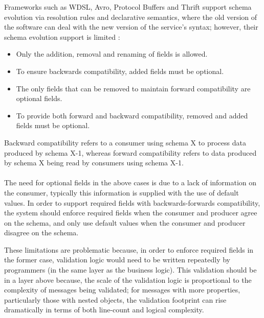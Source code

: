 Frameworks such as WDSL, Avro, Protocol Buffers and Thrift support schema evolution via resolution rules and declarative semantics,
where the old version of the software can deal with the new version of the service’s syntax; however, their schema evolution support is limited \cite{11}:
\begin{itemize}
    \item Only the addition, removal and renaming of fields is allowed.
    \item To ensure backwards compatibility, added fields must be optional.
    \item The only fields that can be removed to maintain forward compatibility are optional fields.
    \item To provide both forward and backward compatibility, removed and added fields must be optional.
\end{itemize}
Backward compatibility refers to a consumer using schema X to process data produced by schema X-1,
whereas forward compatibility refers to data produced by schema X being read by consumers using schema X-1.

\paragraph{}

The need for optional fields in the above cases is due to a lack of information on the consumer, typically this information is supplied with the use of default values.
In order to support required fields with backwards-forwards compatibility, the system should enforce required fields when the consumer and producer agree on the schema,
and only use default values when the consumer and producer disagree on the schema.

These limitations are problematic because, in order to enforce required fields in the former case,
validation logic would need to be written repeatedly by programmers (in the same layer as the business logic).
This validation should be in a layer above because, the scale of the validation logic is proportional to the complexity of messages being validated;
for messages with more properties, particularly those with nested objects, the validation footprint can rise dramatically in terms of both line-count and logical complexity.

\paragraph{}

